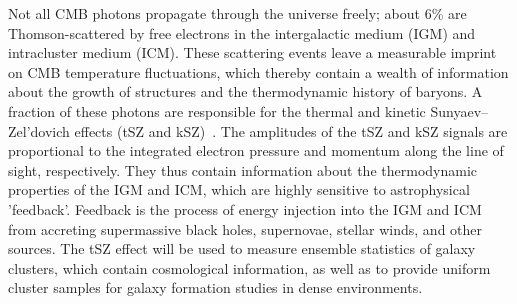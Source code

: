 \documentclass[PICOReport.tex]{subfiles}
\begin{document}
\vspace{0.1in}
 \hspace{0.1in} \label{sz}
Not all CMB photons propagate through the universe freely; about 6\% are Thomson-scattered by free electrons in the intergalactic medium (IGM) and intracluster medium (ICM). These scattering events leave a measurable imprint on CMB temperature fluctuations, which thereby contain a wealth of information about the growth of structures and the thermodynamic history of baryons. A fraction of these photons are responsible for the thermal and kinetic Sunyaev--Zel'dovich effects (tSZ and kSZ)~\citep{zeldovich69,SZ1972}. 
The amplitudes of the tSZ and kSZ signals are proportional to the integrated electron pressure and momentum along the line of sight, respectively.  They thus contain information about the thermodynamic properties of the IGM and ICM, which are highly sensitive to astrophysical 'feedback'. Feedback is the process of energy injection into the IGM and ICM from accreting supermassive black holes, supernovae, stellar winds, and other sources.
The tSZ effect will be used to measure ensemble statistics of galaxy clusters, which contain cosmological information, as well as to provide uniform cluster samples for galaxy formation studies in dense environments. 
\end{document}
